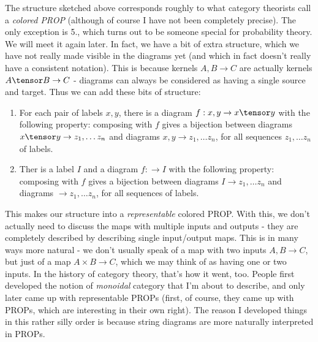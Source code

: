 \documentclass{article}
\begin{document}
The structure sketched above corresponds roughly to what category theorists call a \emph{colored PROP} (although of course I have not been completely precise).
The only exception is 5., which turns out to be someone special for probability theory. We will meet it again later.
In fact, we have a bit of extra structure, which we have not really made visible in the diagrams yet (and which in fact doesn't really have a consistent notation).
This is because kernels $A,B \to C$ are actually kernels $A \tensor B \to C$ - diagrams can always be considered as having a single source and target.
Thus we can add these bits of structure:
\begin{enumerate}
    \item For each pair of labels $x,y$, there is a diagram $f: x,y \to x\tensor y$ with the following property: composing with $f$ gives a bijection between diagrams $x \tensor y \to z_1, \dots z_n$ and diagrams $x,y \to z_1, \dots z_n$, for all sequences $z_1, \dots z_n$ of labels.
    \item Ther is a label $I$ and a diagram $f: \to I$ with the following property: composing with $f$ gives a bijection between diagrams $I \to z_1, \dots z_n$ and diagrams $\to z_1, \dots z_n$, for all sequences of labels.
\end{enumerate}
This makes our structure into a \emph{representable} colored PROP.
With this, we don't actually need to discuss the maps with multiple inputs and outputs - they are completely described by describing single input/output maps.
This is in many ways more natural - we don't usually speak of a map with two inputs $A, B \to C$, but just of a map $A \times B \to C$, which we may think of as having one or two inputs.
In the history of category theory, that's how it went, too. People first developed the notion of \emph{monoidal} category that I'm about to describe, and only later came up with representable PROPs (first, of course, they came up with PROPs, which are interesting in their own right).
The reason I developed things in this rather silly order is because string diagrams are more naturally interpreted in PROPs.
\end{document}

